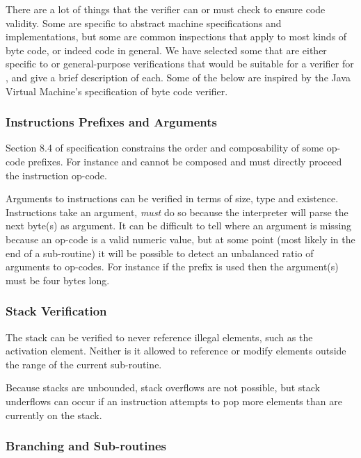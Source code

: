 There are a lot of things that the verifier can or must check to ensure code
validity. Some are specific to abstract machine specifications and
implementations, but some are common inspections that apply to most kinds of
byte code, or indeed code in general. We have selected some that are either
specific to \thename{} or general-purpose verifications that would be suitable
for a verifier for \thename{}, and give a brief description of each. Some of the
below are inspired by the Java Virtual Machine's specification of byte code
verifier\cite{jvm-spec}.


\subsubsection{Instructions Prefixes and Arguments}

Section 8.4 of \thename{} specification constrains the order and composability
of some op-code prefixes. For instance  and  cannot be
composed and  must directly proceed the instruction op-code.

Arguments to instructions can be verified in terms of size, type and
existence. Instructions take an argument, \emph{must} do so because the
interpreter will parse the next byte(s) as argument. It can be difficult to tell
where an argument is missing because an op-code is a valid numeric value, but at
some point (most likely in the end of a sub-routine) it will be possible to
detect an unbalanced ratio of arguments to op-codes. For instance if the
 prefix is used then the argument(s) must be four bytes long.

\subsubsection{Stack Verification}

The stack can be verified to never reference illegal elements, such as the
activation element. Neither is it allowed to reference or modify elements
outside the range of the current sub-routine.

Because stacks are unbounded, stack overflows are not possible, but stack
underflows can occur if an instruction attempts to pop more elements than are
currently on the stack.

\subsubsection{Branching and Sub-routines}


